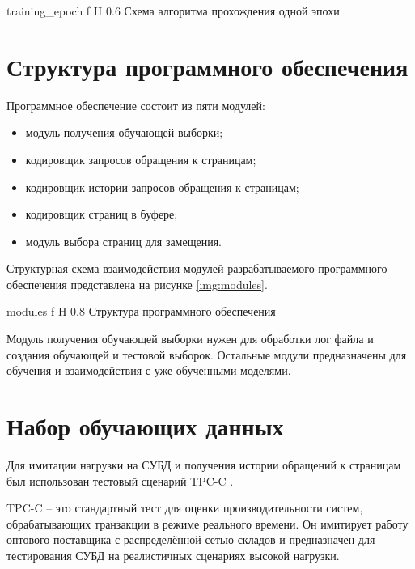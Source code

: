 {training_epoch} %
{f} %
{H} %
{0.6\textwidth} %
{Схема алгоритма прохождения одной эпохи} %

\section{Структура программного обеспечения}

Программное обеспечение состоит из пяти модулей:
\begin{itemize}
	\item модуль получения обучающей выборки;
	\item кодировщик запросов обращения к страницам;
	\item кодировщик истории запросов обращения к страницам;
	\item кодировщик страниц в буфере;
	\item модуль выбора страниц для замещения.
\end{itemize}

Структурная схема взаимодействия модулей разрабатываемого программного обеспечения представлена на рисунке \ref{img:modules}.

{modules} %
{f} %
{H} %
{0.8\textwidth} %
{Структура программного обеспечения} %

Модуль получения обучающей выборки нужен для обработки лог файла и создания обучающей и тестовой выборок.
Остальные модули предназначены для обучения и взаимодействия с уже обученными моделями.

\section{Набор обучающих данных}
Для имитации нагрузки на СУБД и получения истории обращений к страницам был использован тестовый сценарий TPC-C \cite{leutenegger1993modeling}.

TPC-C -- это стандартный тест для оценки производительности систем, обрабатывающих транзакции в режиме реального времени. 
Он имитирует работу оптового поставщика с распределённой сетью складов и предназначен для тестирования СУБД на реалистичных сценариях высокой нагрузки.

